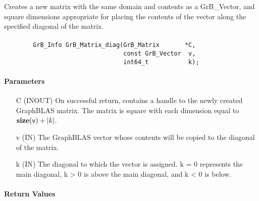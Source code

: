 Creates a new matrix with the same domain and contents as a {\sf GrB\_Vector}, 
and square dimensions appropriate for placing the contents of the vector along the 
specified diagonal of the matrix.

\paragraph{\syntax}

\begin{verbatim}
        GrB_Info GrB_Matrix_diag(GrB_Matrix       *C,
                                 const GrB_Vector  v,
                                 int64_t           k);
\end{verbatim}

\paragraph{Parameters}

\begin{itemize}[leftmargin=1.1in]
    \item[{\sf C}] ({\sf INOUT}) On successful return, contains a handle to 
                                 the newly created GraphBLAS matrix.  The 
                                 matrix is square with each dimension equal to
                                 $\mathbf{size}({\sf v}) + |k|$.
    \item[{\sf v}] ({\sf IN})    The GraphBLAS vector whose contents will be
                                 copied to the diagonal of the matrix.
    \item[{\sf k}] ({\sf IN})    The diagonal to which the vector is assigned. {\sf k} = 0
                                 represents the main diagonal, {\sf k} > 0 is above the main 
                                 diagonal, and {\sf k} < 0 is below.
\end{itemize}


\paragraph{Return Values}

